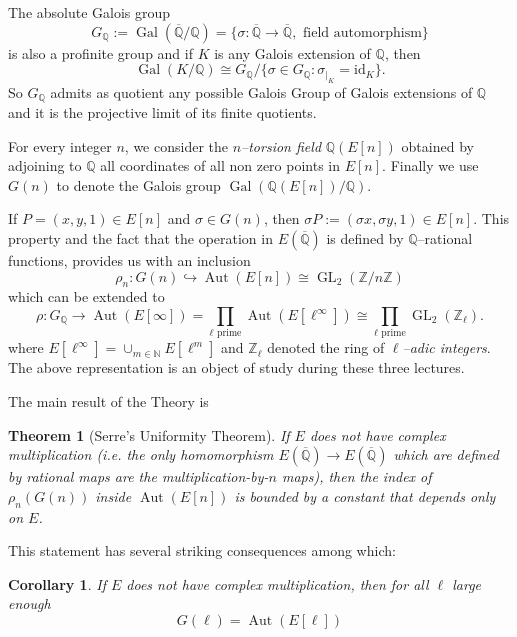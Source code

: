 \documentclass[a4paper,10pt]{article}
\newcommand{\Z}{\mathbb{Z}}
\newcommand{\N}{\mathbb{N}}
\newcommand{\Q}{\mathbb{Q}}
\newtheorem*{theorem}{Theorem}
\newtheorem*{corollary}{Corollary}
\begin{document}
The absolute Galois group 
$$G_\Q:=\operatorname{Gal}(\overline{\Q}/\Q)=\{\sigma:\overline{\Q}\rightarrow\overline{\Q},\text{ field automorphism}\}$$ 
is also a profinite group and if $K$ is any Galois extension of $\Q$, then
$$\operatorname{Gal}(K/\Q)\cong G_\Q/\{\sigma\in G_\Q: \sigma_{|_K}=\text{id}_K\}.$$
So $G_\Q$ admits as quotient any possible Galois Group of Galois extensions of $\Q$ and it is the projective limit of its finite quotients.

For every integer $n$, we consider the \emph{$n$--torsion field} $\Q(E[n])$ obtained by adjoining to $\Q$ all coordinates of
all non zero points in $E[n]$. Finally we use $G(n)$ to denote the Galois group $\operatorname{Gal}(\Q(E[n])/\Q)$. 

If $P=(x,y,1)\in E[n]$ and $\sigma\in G(n)$, then $\sigma P:=(\sigma x,\sigma y,1)\in E[n]$. This property and the fact that the operation in $E(\overline{\Q})$
is defined by $\Q$--rational functions, provides us with an inclusion
$$\rho_n: G(n)\hookrightarrow\operatorname{Aut}(E[n])\cong \operatorname{GL}_2(\Z/n\Z)$$
which can be extended to
$$\rho: G_\Q\longrightarrow \operatorname{Aut}(E[\infty])=\prod_{\ell\text{ prime}}\operatorname{Aut}(E[\ell^\infty])
\cong \prod_{\ell\text{ prime}}\operatorname{GL}_2(\Z_\ell).$$
where $E[\ell^\infty]=\cup_{m\in\N}E[\ell^m]$ and $\Z_\ell$ denoted the ring of \emph{$\ell$--adic integers}.
The above representation is an object of study during these three lectures. 

The main result of the Theory is

\begin{theorem}[Serre's Uniformity Theorem] If $E$ does not have complex multiplication (i.e. the only homomorphism
$E(\overline{\Q})\rightarrow E(\overline{\Q})$ which are defined by rational maps are the \emph{multiplication-by-$n$ maps}), 
then the index of $\rho_n(G(n))$ inside $\operatorname{Aut}(E[n])$ is bounded by a constant that depends
only on $E$. 
\end{theorem}

This statement has several striking consequences among which:
\begin{corollary} If $E$ does not have complex multiplication, then  for all $\ell$ large enough 
$$G(\ell)= \operatorname{Aut}(E[\ell])$$
\end{corollary}
\end{document}
